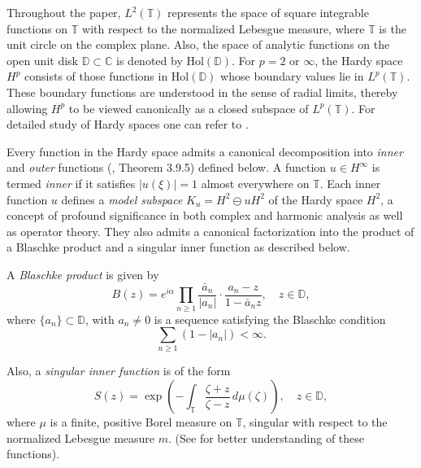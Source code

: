 \documentclass[12pt,a4paper]{amsart}
\begin{document}
Throughout the paper, $L^2(\mathbb T)$ represents the space of square integrable functions on $\mathbb T$ with respect to the normalized Lebesgue measure, where $\mathbb T$ is the unit circle on the complex plane. Also, the space of analytic functions on the open unit disk \( \mathbb{D} \subset \mathbb{C} \) is denoted by \( \text{Hol}(\mathbb{D}) \). For \( p = 2 \) or \( \infty \), the Hardy space \( H^p \) consists of those functions in \( \text{Hol}(\mathbb{D}) \) whose boundary values lie in \( L^p(\mathbb{T}) \). These boundary functions are understood in the sense of radial limits, thereby allowing \( H^p \) to be viewed canonically as a closed subspace of \( L^p(\mathbb{T}) \). For detailed study of Hardy spaces one can refer to \cite{mashregi, N2, N3}.

\smallskip

Every function in the Hardy space admits a canonical decomposition into \emph{inner} and \emph{outer} functions (\cite{N2}, Theorem 3.9.5) defined below. A function \( u \in H^\infty \) is termed \emph{inner} if it satisfies \( |u(\xi)| = 1 \) almost everywhere on \( \mathbb{T} \). Each inner function \( u \) defines a \emph{model subspace} \( K_u = H^2 \ominus u H^2 \) of the Hardy space \( H^2 \), a concept of profound significance in both complex and harmonic analysis as well as operator theory. They also admits a canonical factorization into the product of a Blaschke product and a singular inner function as described below.

A \emph{Blaschke product} is given by
\[
B(z) = e^{i\alpha} \prod_{n \geq 1} \frac{\bar{a}_n}{|a_n|} \cdot \frac{a_n - z}{1 - \bar{a}_n z}, \quad z \in \mathbb{D},
\]
where \( \{a_n\} \subset \mathbb{D} \), with \(a_n\neq0\) is a sequence satisfying the Blaschke condition
\[
\sum_{n \geq 1} (1 - |a_n|) < \infty.
\]

Also, a \emph{singular inner function} is of the form
\[
S(z) = \exp\left( - \int_{\mathbb{T}} \frac{\zeta + z}{\zeta - z} \, d\mu(\zeta) \right), \quad z \in \mathbb{D},
\]
where \( \mu \) is a finite, positive Borel measure on \( \mathbb{T} \), singular with respect to the normalized Lebesgue measure \( m \). (See \cite{N2} for better understanding of these functions).

\smallskip
\end{document}
